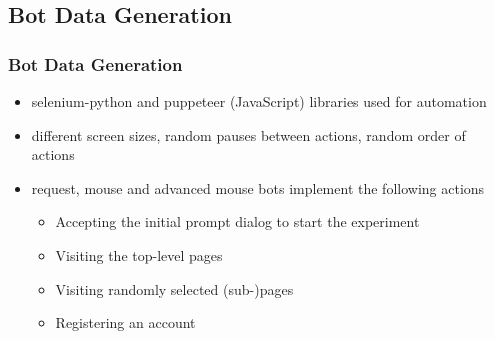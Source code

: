 \documentclass[t,aspectratio=169,table]{beamer}
\begin{document}
\subsection{Bot Data Generation}
\begin{frame}
\frametitle{Bot Data Generation}

\begin{itemize}
    \item selenium-python and puppeteer (JavaScript) libraries used for automation
    \item different screen sizes, random pauses between actions, random order of actions
    \item request, mouse and advanced mouse bots implement the following actions
    \begin{itemize}
        \item Accepting the initial prompt dialog to start the experiment
        \item Visiting the top-level pages
        \item Visiting randomly selected (sub-)pages
        \item Registering an account
    \end{itemize}
\end{itemize}

\end{frame}
\end{document}
